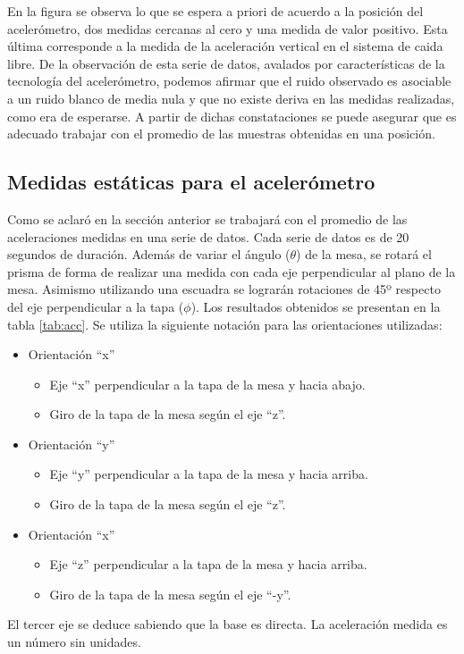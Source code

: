 \documentclass[main]{subfiles}
\begin{document}
En la figura se observa lo que se espera a priori de acuerdo a la posici\'on del aceler\'ometro, dos medidas cercanas al cero y una medida de valor positivo. Esta \'ultima corresponde a la medida de la aceleraci\'on vertical en el sistema de caida libre. De la observaci\'on de esta serie de datos, avalados por características de la tecnología del acelerómetro, podemos afirmar que el ruido observado es asociable a un ruido blanco de media nula y que no existe deriva en las medidas realizadas, como era de esperarse. A partir de dichas constataciones se puede asegurar que es adecuado trabajar con el promedio de las muestras obtenidas en una posici\'on.


\subsection{Medidas estáticas para el acelerómetro}

Como se aclaró en la sección anterior se trabajará con el promedio de las aceleraciones medidas en una serie de datos. Cada serie de datos es de 20 segundos de duración. Además de variar el ángulo ($\theta$) de la mesa, se rotará el prisma de forma de realizar una medida con cada eje perpendicular al plano de la mesa. Asimismo utilizando una escuadra se lograrán rotaciones de 45º respecto del eje perpendicular a la tapa ($\phi$). Los resultados obtenidos se presentan en la tabla \ref{tab:acc}. Se utiliza la siguiente notación para las orientaciones utilizadas:
\begin{itemize}
	\item Orientación ``x''
	\begin{itemize}
		\item Eje ``x'' perpendicular a la tapa de la mesa y hacia abajo.
		\item Giro de la tapa de la mesa según el eje ``z''.
	\end{itemize}
	\item Orientación ``y''
	\begin{itemize}
		\item Eje ``y'' perpendicular a la tapa de la mesa y hacia arriba.
		\item Giro de la tapa de la mesa según el eje ``z''.
	\end{itemize}
	\item Orientación ``x''
	\begin{itemize}
		\item Eje ``z'' perpendicular a la tapa de la mesa y hacia arriba.
		\item Giro de la tapa de la mesa según el eje ``-y''.
	\end{itemize}
\end{itemize}
El tercer eje se deduce sabiendo que la base es directa. La aceleración medida es un número sin unidades.
\end{document}
